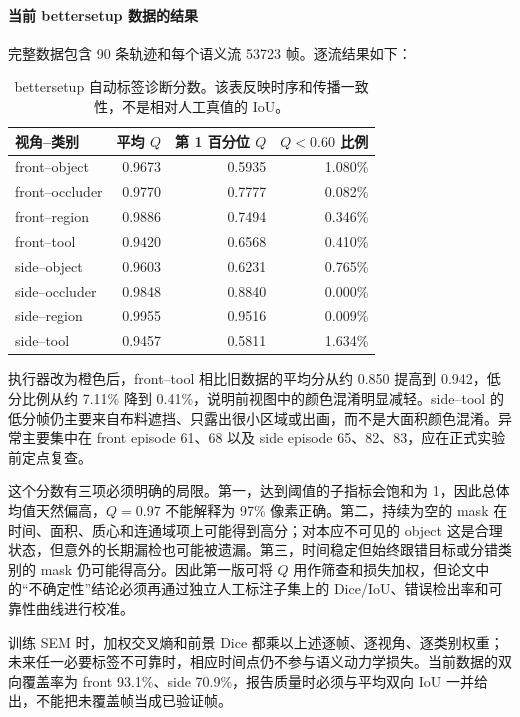\documentclass[UTF8,a4paper,11pt]{ctexart}
\begin{document}
\paragraph{当前 bettersetup 数据的结果}
完整数据包含 90 条轨迹和每个语义流 53723 帧。逐流结果如下：
\begin{table}[htbp]
  \centering
  \small
  \begin{tabular}{lrrr}
    \toprule
    视角--类别 & 平均 $Q$ & 第 1 百分位 $Q$ & $Q<0.60$ 比例 \\
    \midrule
    front--object   & 0.9673 & 0.5935 & 1.080\% \\
    front--occluder & 0.9770 & 0.7777 & 0.082\% \\
    front--region   & 0.9886 & 0.7494 & 0.346\% \\
    front--tool     & 0.9420 & 0.6568 & 0.410\% \\
    side--object    & 0.9603 & 0.6231 & 0.765\% \\
    side--occluder  & 0.9848 & 0.8840 & 0.000\% \\
    side--region    & 0.9955 & 0.9516 & 0.009\% \\
    side--tool      & 0.9457 & 0.5811 & 1.634\% \\
    \bottomrule
  \end{tabular}
  \caption{bettersetup 自动标签诊断分数。该表反映时序和传播一致性，不是相对人工真值的 IoU。}
\end{table}
执行器改为橙色后，front--tool 相比旧数据的平均分从约 0.850 提高到 0.942，低分比例从约 7.11\% 降到 0.41\%，说明前视图中的颜色混淆明显减轻。side--tool 的低分帧仍主要来自布料遮挡、只露出很小区域或出画，而不是大面积颜色混淆。异常主要集中在 front episode 61、68 以及 side episode 65、82、83，应在正式实验前定点复查。

这个分数有三项必须明确的局限。第一，达到阈值的子指标会饱和为 1，因此总体均值天然偏高，$Q=0.97$ 不能解释为 97\% 像素正确。第二，持续为空的 mask 在时间、面积、质心和连通域项上可能得到高分；对本应不可见的 object 这是合理状态，但意外的长期漏检也可能被遗漏。第三，时间稳定但始终跟错目标或分错类别的 mask 仍可能得高分。因此第一版可将 $Q$ 用作筛查和损失加权，但论文中的“不确定性”结论必须再通过独立人工标注子集上的 Dice/IoU、错误检出率和可靠性曲线进行校准。

训练 SEM 时，加权交叉熵和前景 Dice 都乘以上述逐帧、逐视角、逐类别权重；未来任一必要标签不可靠时，相应时间点仍不参与语义动力学损失。当前数据的双向覆盖率为 front 93.1\%、side 70.9\%，报告质量时必须与平均双向 IoU 一并给出，不能把未覆盖帧当成已验证帧。
\end{document}
